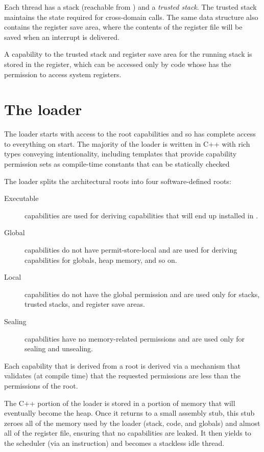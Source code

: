Each thread has a stack (reachable from \CSP) and a \textit{trusted stack}.
The trusted stack maintains the state required for cross-domain calls.
The same data structure also contains the register save area, where the contents of the register file will be saved when an interrupt is delivered.

A capability to the trusted stack and register save area for the running stack is stored in the \MScratchC{} register, which can be accessed only by code whose \PCC{} has the permission to access system registers.

\section{The loader}

The loader starts with access to the root capabilities and so has complete access to everything on start.
The majority of the loader is written in C++ with rich types conveying intentionality, including templates that provide capability permission sets as compile-time constants that can be statically checked

The loader splits the architectural roots into four software-defined roots:

\begin{description}
	\item[Executable] capabilities are used for deriving capabilities that will end up installed in \PCC{}.
	\item[Global] capabilities do not have permit-store-local and are used for deriving capabilities for globals, heap memory, and so on.
	\item[Local] capabilities do not have the global permission and are used only for stacks, trusted stacks, and register save areas.
	\item[Sealing] capabilities have no memory-related permissions and are used only for sealing and unsealing.
\end{description}

Each capability that is derived from a root is derived via a mechanism that validates (at compile time) that the requested permissions are less than the permissions of the root.

The C++ portion of the loader is stored in a portion of memory that will eventually become the heap.
Once it returns to a small assembly stub, this stub zeroes all of the memory used by the loader (stack, code, and globals) and almost all of the register file, ensuring that no capabilities are leaked.
It then yields to the scheduler (via an  instruction) and becomes a stackless idle thread.

